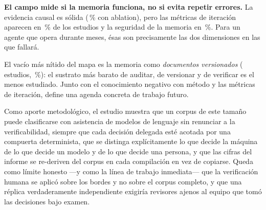 \documentclass[conference]{IEEEtran}
\begin{document}
\textbf{El campo mide si la memoria funciona, no si evita repetir errores.} La evidencia causal es
sólida (\clRQcincoAblationPct{}\,\% con ablation), pero las métricas de iteración aparecen en
\clRQcincoMetricaIteracionPct{}\,\% de los estudios y la seguridad de la memoria en
\clRQseisSeguridadPct{}\,\%. Para un agente que opera durante meses, ésas son precisamente las dos
dimensiones en las que fallará.

El vacío más nítido del mapa es la memoria como \emph{documentos versionados}
(\clMFdocsVersionado{} estudios, \clMFdocsVersionadoPct{}\,\%): el sustrato más barato de auditar, de
versionar y de verificar es el menos estudiado. Junto con el conocimiento negativo con método y las
métricas de iteración, define una agenda concreta de trabajo futuro.

Como aporte metodológico, el estudio muestra que un corpus de este tamaño puede clasificarse con
asistencia de modelos de lenguaje sin renunciar a la verificabilidad, siempre que cada decisión
delegada esté acotada por una compuerta determinista, que se distinga explícitamente lo que decide
la máquina de lo que decide un modelo y de lo que decide una persona, y que las cifras del informe
se re-deriven del corpus en cada compilación en vez de copiarse. Queda como límite honesto —y como
la línea de trabajo inmediata— que la verificación humana se aplicó sobre los bordes y no sobre el
corpus completo, y que una réplica verdaderamente independiente exigiría revisores ajenos al equipo
que tomó las decisiones bajo examen.



\end{document}
